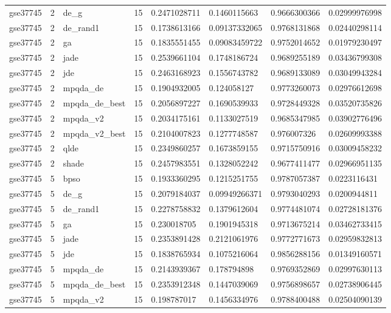 \begin{table}[t]
\begin{tabular}{llllllll}
gse37745 & 2 & de\_g & 15 & 0.2471028711 & 0.1460115663 & 0.9666300366 & 0.02999976998 \\
gse37745 & 2 & de\_rand1 & 15 & 0.1738613166 & 0.09137332065 & 0.9768131868 & 0.02440298114 \\
gse37745 & 2 & ga & 15 & 0.1835551455 & 0.09083459722 & 0.9752014652 & 0.01979230497 \\
gse37745 & 2 & jade & 15 & 0.2539661104 & 0.1748186724 & 0.9689255189 & 0.03436799308 \\
gse37745 & 2 & jde & 15 & 0.2463168923 & 0.1556743782 & 0.9689133089 & 0.03049943284 \\
gse37745 & 2 & mpqda\_de & 15 & 0.1904932005 & 0.124058127 & 0.9773260073 & 0.02976612698 \\
gse37745 & 2 & mpqda\_de\_best & 15 & 0.2056897227 & 0.1690539933 & 0.9728449328 & 0.03520735826 \\
gse37745 & 2 & mpqda\_v2 & 15 & 0.2034175161 & 0.1133027519 & 0.9685347985 & 0.03902776496 \\
gse37745 & 2 & mpqda\_v2\_best & 15 & 0.2104007823 & 0.1277748587 & 0.976007326 & 0.02609993388 \\
gse37745 & 2 & qlde & 15 & 0.2349860257 & 0.1673859155 & 0.9715750916 & 0.03009458232 \\
gse37745 & 2 & shade & 15 & 0.2457983551 & 0.1328052242 & 0.9677411477 & 0.02966951135 \\
gse37745 & 5 & bpso & 15 & 0.1933360295 & 0.1215251755 & 0.9787057387 & 0.0223116431 \\
gse37745 & 5 & de\_g & 15 & 0.2079184037 & 0.09949266371 & 0.9793040293 & 0.0200944811 \\
gse37745 & 5 & de\_rand1 & 15 & 0.2278758832 & 0.1379612604 & 0.9774481074 & 0.02728181376 \\
gse37745 & 5 & ga & 15 & 0.230018705 & 0.1901945318 & 0.9713675214 & 0.03462733415 \\
gse37745 & 5 & jade & 15 & 0.2353891428 & 0.2121061976 & 0.9772771673 & 0.02959832813 \\
gse37745 & 5 & jde & 15 & 0.1838765934 & 0.1075216064 & 0.9856288156 & 0.01349160571 \\
gse37745 & 5 & mpqda\_de & 15 & 0.2143939367 & 0.178794898 & 0.9769352869 & 0.02997630113 \\
gse37745 & 5 & mpqda\_de\_best & 15 & 0.2353912348 & 0.1447039069 & 0.9756898657 & 0.02738906445 \\
gse37745 & 5 & mpqda\_v2 & 15 & 0.198787017 & 0.1456334976 & 0.9788400488 & 0.02504090139 \\

\end{tabular}
\end{table}
